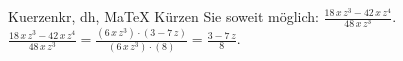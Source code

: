 \begin{MAufgabe}{Kuerzen}{kr, dh, MaTeX}
K\"urzen Sie soweit m\"oglich: $\frac{18\, x\, z^3 - 42\, x\, z^4}{48\, x\, z^3}$.\\ 
\ifLsg\MLoesung
\quad $\frac{18\, x\, z^3 - 42\, x\, z^4}{48\, x\, z^3}=\frac{(6\, x\, z^3)\cdot(3 - 7\, z)}{(6\, x\, z^3)\cdot(8)}=\frac{3 - 7\, z}{8}$.\else\relax\fi
 \end{MAufgabe}